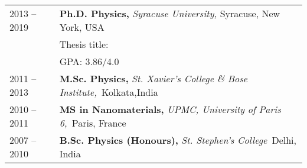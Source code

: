 


\begin{longtable}{R{2.5cm}|p{14.8cm}}
 	\textsc{2013 -- 2019} &\textbf{Ph.D. Physics, } \emph{Syracuse University,} Syracuse, New York, USA\\ 
& Thesis title:  \\ & \textsc{GPA:} 3.86/4.0\\
	\textsc{2011 -- 2013} & \textbf{M.Sc. Physics, }\emph{St. Xavier's College \& Bose Institute,}{~Kolkata,}{India} \\
\textsc{2010 -- 2011} &\textbf{MS in Nanomaterials, }\emph{UPMC, University of Paris 6,}{~Paris, }{France} \\
\textsc{2007 -- 2010} & \textbf{B.Sc. Physics (Honours), } \emph{St. Stephen's College}{~Delhi, }{India} \\	
\end{longtable}
